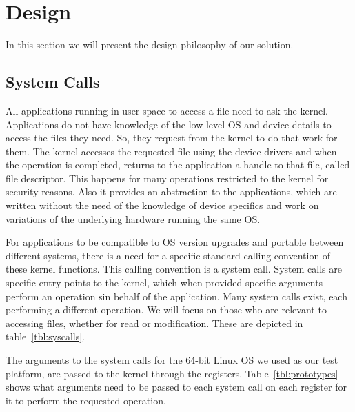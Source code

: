 \section{Design}\label{sec:design}
In this section we will present the design philosophy of our solution.

\subsection{System Calls}\label{sub:syscalls}
All applications running in user-space to access a file need to ask the kernel. Applications do not have knowledge of the low-level \ac{OS} and device details to access the files they need. So, they request from the kernel to do that work for them. The kernel accesses the requested file using the device drivers and when the operation is completed, returns to the application a handle to that file, called file descriptor. This happens for many operations restricted to the kernel for security reasons. Also it provides an abstraction to the applications, which are written without the need of the knowledge of device specifics and work on variations of the underlying hardware running the same \ac{OS}. 

\par For applications to be compatible to \ac{OS} version upgrades and portable between different systems, there is a need for a specific standard calling convention of these kernel functions. This calling convention is a system call. System calls are specific entry points to the kernel, which when provided specific arguments perform an operation sin behalf of the application. Many system calls exist, each performing a different operation. We will focus on those who are relevant to accessing files, whether for read or modification. These are depicted in table~\ref{tbl:syscalls}.
\par The arguments to the system calls for the 64-bit Linux \ac{OS} we used as our test platform, are passed to the kernel through the registers. Table~\ref{tbl:prototypes} shows what arguments need to be passed to each system call on each register for it to perform the requested operation.



